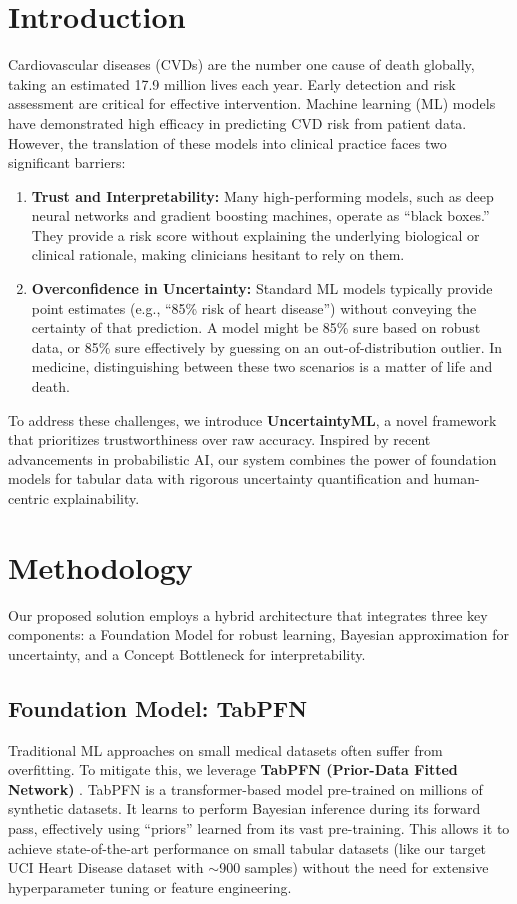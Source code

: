 \documentclass[conference]{IEEEtran}
\begin{document}
\section{Introduction}
Cardiovascular diseases (CVDs) are the number one cause of death globally, taking an estimated 17.9 million lives each year. Early detection and risk assessment are critical for effective intervention. Machine learning (ML) models have demonstrated high efficacy in predicting CVD risk from patient data. However, the translation of these models into clinical practice faces two significant barriers:
\begin{enumerate}
    \item \textbf{Trust and Interpretability:} Many high-performing models, such as deep neural networks and gradient boosting machines, operate as ``black boxes.'' They provide a risk score without explaining the underlying biological or clinical rationale, making clinicians hesitant to rely on them.
    \item \textbf{Overconfidence in Uncertainty:} Standard ML models typically provide point estimates (e.g., ``85\% risk of heart disease'') without conveying the certainty of that prediction. A model might be 85\% sure based on robust data, or 85\% sure effectively by guessing on an out-of-distribution outlier. In medicine, distinguishing between these two scenarios is a matter of life and death.
\end{enumerate}

To address these challenges, we introduce \textbf{UncertaintyML}, a novel framework that prioritizes trustworthiness over raw accuracy. Inspired by recent advancements in probabilistic AI, our system combines the power of foundation models for tabular data with rigorous uncertainty quantification and human-centric explainability.

\section{Methodology}
Our proposed solution employs a hybrid architecture that integrates three key components: a Foundation Model for robust learning, Bayesian approximation for uncertainty, and a Concept Bottleneck for interpretability.

\subsection{Foundation Model: TabPFN}
Traditional ML approaches on small medical datasets often suffer from overfitting. To mitigate this, we leverage \textbf{TabPFN (Prior-Data Fitted Network)} \cite{hollmann2023tabpfn}. TabPFN is a transformer-based model pre-trained on millions of synthetic datasets. It learns to perform Bayesian inference during its forward pass, effectively using ``priors'' learned from its vast pre-training. This allows it to achieve state-of-the-art performance on small tabular datasets (like our target UCI Heart Disease dataset with $\sim$900 samples) without the need for extensive hyperparameter tuning or feature engineering.
\end{document}
